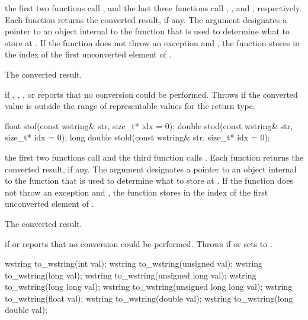 \begin{itemdescr}
\pnum
\effects the first two functions call ,
and the last three functions call ,
, and , respectively. Each function returns the converted result, if any. The
argument  designates a pointer to an object internal to the function
that is used to determine what to store at . If the function does
not throw an exception and , the function stores in 
the index of the first unconverted element of .

\pnum
\returns The converted result.

\pnum
\throws {} if , , , or
 reports that no conversion could be performed. Throws
 if the converted value is outside the range of representable values
for the return type.
\end{itemdescr}

%
%
%
\begin{itemdecl}
float stof(const wstring& str, size_t* idx = 0);
double stod(const wstring& str, size_t* idx = 0);
long double stold(const wstring& str, size_t* idx = 0);
\end{itemdecl}

\begin{itemdescr}
\pnum
\effects the first two functions call  and the third
function calls . Each function returns the converted
result, if any. The argument  designates a pointer to an object internal to
the function that is used to determine what to store at . If the function
does not throw an exception and , the function stores in 
the index of the first unconverted element of .

\pnum
\returns The converted result.

\pnum
\throws {} if  or  reports that no
conversion could be performed. Throws  if  or
 sets  to .
\end{itemdescr}

%
\begin{itemdecl}
wstring to_wstring(int val);
wstring to_wstring(unsigned val);
wstring to_wstring(long val);
wstring to_wstring(unsigned long val);
wstring to_wstring(long long val);
wstring to_wstring(unsigned long long val);
wstring to_wstring(float val);
wstring to_wstring(double val);
wstring to_wstring(long double val);
\end{itemdecl}

